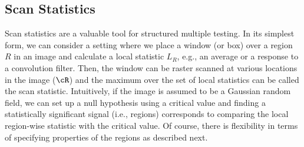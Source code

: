 \subsection{Scan Statistics}
Scan statistics are a valuable tool for structured multiple testing.
In its simplest form, we can consider a setting where we place a window (or box) over a region $R$ in an image and calculate 
a local statistic $L_R$, e.g., an average or a response to a convolution filter. 
Then, the window can be raster scanned at various locations in the image ($\cR$) and the maximum 
over the set of local statistics can be called the scan statistic. 
Intuitively, if the image is assumed to be a Gaussian random field, we can set up a null hypothesis using a
critical value and finding a statistically significant signal (i.e., regions) corresponds to comparing 
the local region-wise statistic with the critical value.  
Of course, there is flexibility in terms of specifying properties of the regions as described next. 
 
